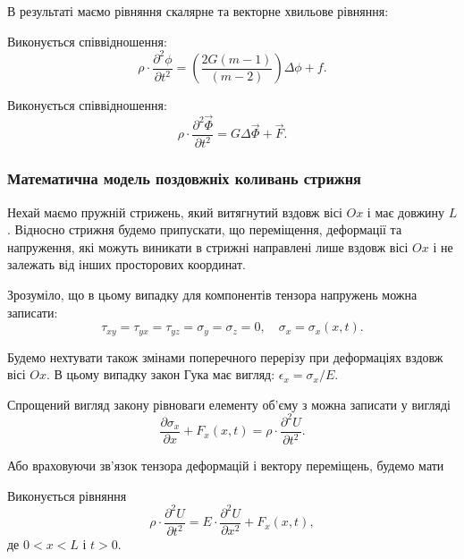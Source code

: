 В результаті маємо рівняння скалярне та векторне хвильове рівняння:
\begin{th_equation}
	Виконується співвідношення:
	\begin{equation}
		\rho \cdot \frac{\partial^2 \phi}{\partial t^2} = \left( \frac{2 G (m - 1)}{(m - 2)} \right) \Delta \phi + f.
	\end{equation}
\end{th_equation}

\begin{th_equation}
	Виконується співвідношення:
	\begin{equation}
		\rho \cdot \frac{\partial^2 \vec \Phi}{\partial t^2} = G \Delta  \vec \Phi + \vec F.
	\end{equation}
\end{th_equation}

\subsubsection{Математична модель поздовжніх коливань стрижня}

Нехай маємо пружній стрижень, який витягнутий вздовж вісі $Ox$ і має довжину $L$. Відносно стрижня будемо припускати, що переміщення, деформації та напруження, які можуть виникати в стрижні направлені лише вздовж вісі $Ox$ і не залежать від інших просторових координат. \medskip

Зрозуміло, що в цьому випадку для компонентів тензора напружень можна записати: 
\begin{equation}
	\tau_{x y} = \tau_{y x} = \tau_{y z} = \sigma_y = \sigma_z = 0, \quad \sigma_x = \sigma_x(x, t).
\end{equation}

Будемо нехтувати також змінами поперечного перерізу при деформаціях вздовж вісі $Ox$. В цьому випадку закон Гука має вигляд: $\epsilon_x = \sigma_x / E$. \medskip

Спрощений вигляд закону рівноваги елементу об'єму з можна записати у вигляді
\begin{equation}
	\frac{\partial \sigma_x}{\partial x} + F_x(x, t) = \rho \cdot \frac{\partial^2 U}{\partial t^2}.
\end{equation}

Або враховуючи зв'язок тензора деформацій і вектору переміщень, будемо мати 
\begin{th_equation}
	Виконується рівняння
	\begin{equation}
		\rho \cdot \frac{\partial^2 U}{\partial t^2} = E \cdot \frac{\partial^2 U}{\partial x^2} + F_x(x, t),
	\end{equation}
	де $0 < x < L$ і $t > 0$.
\end{th_equation}

